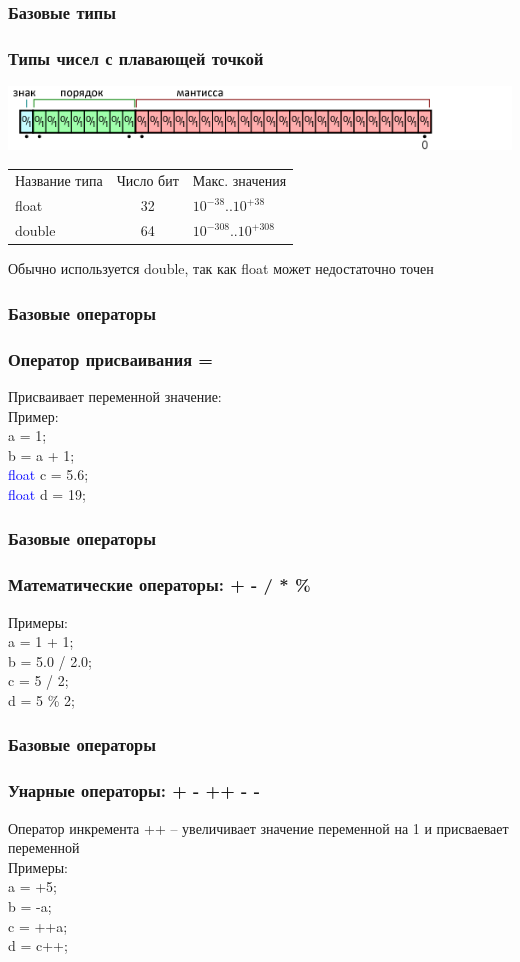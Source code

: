 \documentclass[12pt,pdf,hyperref={unicode}]{beamer}
\begin{document}
\begin{frame}
\frametitle{Базовые типы}
\frametitle{Типы чисел с плавающей точкой} 
\includegraphics[scale=0.6]{floats.png}
\begin{center}
\begin{tabular}{ l c l }
  Название типа & Число бит & Макс. значения \\
  float & 32 & $10^{-38}$..$10^{+38}$ \\
  double & 64 & $10^{-308}$..$10^{+308}$ \\
\end{tabular}
\end{center}
Обычно используется double, так как float может недостаточно точен
\end{frame}

\begin{frame}
\frametitle{Базовые операторы}
\frametitle{Оператор присваивания =} 
Присваивает переменной значение:\\
Пример:\\
\quad a = 1;\\
\quad b = a + 1;\\
\quad \textcolor{blue}{float} c = 5.6;\\
\quad \textcolor{blue}{float} d = 19;\\

\end{frame}


\begin{frame}
\frametitle{Базовые операторы}
\frametitle{Математические операторы: + - / * \%} 
Примеры:\\
\quad a = 1 + 1; \\
\quad b = 5.0 / 2.0;\\
\quad c = 5 / 2;\\
\quad d = 5 \% 2;\\
\end{frame}

\begin{frame}
\frametitle{Базовые операторы}
\frametitle{Унарные операторы: + - ++ - -}
Оператор инкремента ++ -- увеличивает значение переменной на 1 и присваевает переменной  \\
Примеры:\\
\quad a = +5; \\
\quad b = -a;\\
\quad c = ++a;\\
\quad d = c++;\\
\end{frame}
\end{document}
